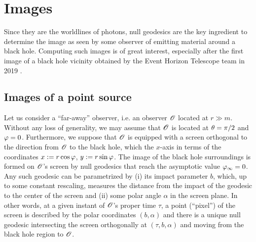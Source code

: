 
\section{Images} \label{s:gis:images}

Since they are the worldlines of photons, null geodesics are the key ingredient to
determine the image as seen by some observer of emitting material around
a black hole. Computing such images is of great interest, especially after
the first image of a black hole vicinity obtained by
the Event Horizon Telescope team in 2019 \cite{EHT19a,Cardo19}.

\subsection{Images of a point source}

Let us consider a ``far-away'' observer, i.e. an observer $\mathscr{O}$ located at $r\gg m$. Without
any loss of generality, we may assume that $\mathscr{O}$ is located at $\theta=\pi/2$ and $\varphi=0$.
Furthermore, we suppose that $\mathscr{O}$ is
equipped with a screen orthogonal to the direction from $\mathscr{O}$ to the black hole, which
the $x$-axis in terms of the coordinates $x:=r\cos\varphi$, $y:=r\sin\varphi$.
The image of the black hole surroundings is formed on $\mathscr{O}$'s screen by null geodesics
that reach the asymptotic value $\varphi_\infty = 0$. Any such geodesic can be parametrized by
(i) its impact parameter $b$, which, up to some constant rescaling, measures the distance from
the impact of the geodesic to the center of the screen and (ii) some polar angle $\alpha$ in the screen plane.
In other words,
at a given instant of $\mathscr{O}$'s proper time $\tau$, a point (``pixel'') of the screen is
described by the polar coordinates $(b,\alpha)$ and there is a unique null geodesic intersecting
the screen orthogonally at $(\tau,b,\alpha)$ and moving from the black hole region to $\mathscr{O}$.

